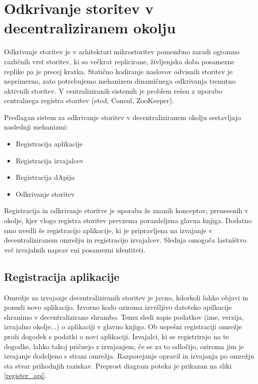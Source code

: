 \documentclass[a4paper, 12pt]{book}
\begin{document}
\section{Odkrivanje storitev v decentraliziranem okolju}

Odkrivanje storitev je v arhitekturi mikrostoritev pomembno zaradi ogromno različnih vrst storitev, ki so večkrat replicirane, življenjska doba posamezne replike pa je precej kratka.
Statično kodiranje naslovov odvisnih storitev je neprimerno, zato potrebujemo mehanizem dinamičnega odkrivanja trenutno aktivnih storitev.
V centraliziranih sistemih je problem rešen z uporabo centralnega registra storitev (etcd, Consul, ZooKeeper).

Predlagan sistem za odkrivanje storitev v decentraliziranem okolju sestavljajo naslednji mehanizmi:
\begin{itemize}
	\item Registracija aplikacije
	\item Registracija izvajalcev
	\item Registracija dApija
	\item Odkrivanje storitev
\end{itemize}

Registracija in odkrivanje storitve je uporaba že znanih konceptov, prenesenih v okolje, kjer vlogo registra storitev prevzema porazdeljena glavna knjiga.
Dodatno smo uvedli še registracijo aplikacije, ki je pripravljena na izvajanje v decentraliziranem omrežju in registracijo izvajalcev.
Slednja omogoča lastništvo več izvajalnih naprav eni posamezni identiteti.


\subsection{Registracija aplikacije}
\label{registerService}

Omrežje za izvajanje decentraliziranih storitev je javno, kdorkoli lahko objavi in ponudi novo aplikacijo.
Izvorno kodo oziroma izvršljivo datoteko apilkacije shranimo v decentralizirano shrambo.
Temu sledi zapis podatkov (ime, verzija, izvajalno okolje...) o aplikaciji v glavno knjigo.
Ob uspešni registraciji omrežje proži dogodek s podatki o novi aplikaciji.
Izvajalci, ki se registrirajo na te dogodke, lahko takoj pričnejo z izvajanjem, če se za to odločijo, oziroma jim je izvajanje dodeljeno s strani omrežja.
Razporejanje opravil in izvajanja po omrežju sta stvar prihodnjih raziskav.
Preprost diagram poteka je prikazan na sliki \ref{register_api}.
\end{document}
